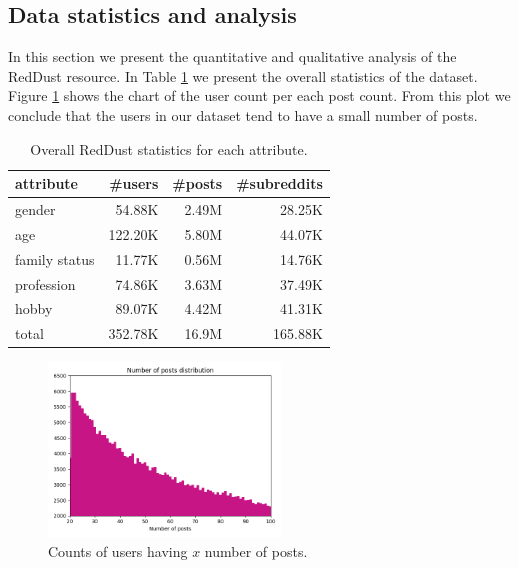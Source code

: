 \subsection{Data statistics and analysis}

In this section we present the quantitative and qualitative analysis of the RedDust resource. In Table \ref{stats_table} we present the overall
statistics of the dataset. Figure \ref{num_posts} shows the chart of the user count per each post count. From this plot we conclude that the users in our dataset tend to have a small number of posts.

\begin{table}[h!]%
\centering
\small
\begin{adjustbox}{width=0.55\textwidth}
\begin{tabular}{lrrr}
\toprule
\textbf{attribute} & \textbf{\#users} & \textbf{\#posts} & \textbf{\#subreddits} \\
\midrule
gender & 54.88K & 2.49M & 28.25K \\
age & 122.20K & 5.80M & 44.07K \\
family status & 11.77K & 0.56M & 14.76K \\
profession & 74.86K & 3.63M & 37.49K \\
hobby & 89.07K & 4.42M & 41.31K \\
\midrule
total & 352.78K & 16.9M & 165.88K \\
\bottomrule
\end{tabular}
\end{adjustbox}
\caption{Overall RedDust statistics for each attribute.}
\label{stats_table}
\end{table}

\begin{figure}[!h]
\centering
\includegraphics[width=0.55\textwidth]{data/pics/num_posts.png}
\caption{Counts of users having $x$ number of posts.}
\label{num_posts}
\end{figure}

